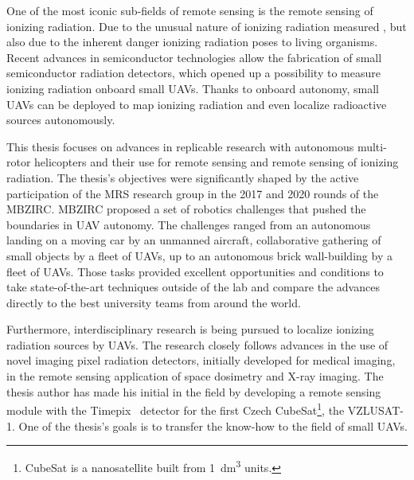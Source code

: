 \documentclass[a4paper,11pt,twoside,openright]{book}
\begin{document}
One of the most iconic sub-fields of remote sensing is the remote sensing of ionizing radiation.
Due to the unusual nature of ionizing radiation measured \cite{andreo2017fundamentals}, but also due to the inherent danger ionizing radiation poses to living organisms.
Recent advances in semiconductor technologies allow the fabrication of small semiconductor radiation detectors, which opened up a possibility to measure ionizing radiation onboard small \acp{UAV}.
Thanks to onboard autonomy, small \acp{UAV} can be deployed to map ionizing radiation and even localize radioactive sources autonomously.

This thesis focuses on advances in replicable research with autonomous multi-rotor helicopters and their use for remote sensing and remote sensing of ionizing radiation.
The thesis's objectives were significantly shaped by the active participation of the \ac{MRS} research group in the 2017 and 2020 rounds of the \ac{MBZIRC}.
MBZIRC proposed a set of robotics challenges that pushed the boundaries in \ac{UAV} autonomy.
The challenges ranged from an autonomous landing on a moving car by an unmanned aircraft, collaborative gathering of small objects by a fleet of \acp{UAV}, up to an autonomous brick wall-building by a fleet of \acp{UAV}.
Those tasks provided excellent opportunities and conditions to take state-of-the-art techniques outside of the lab and compare the advances directly to the best university teams from around the world.

Furthermore, interdisciplinary research is being pursued to localize ionizing radiation sources by \acp{UAV}.
The research closely follows advances in the use of novel imaging pixel radiation detectors, initially developed for medical imaging, in the remote sensing application of space dosimetry and X-ray imaging.
The thesis author has made his initial in the field by developing a remote sensing module with the Timepix~\cite{llopart2007timepix} detector for the first Czech CubeSat\footnote{CubeSat is a nanosatellite built from \SI{1}{\deci\meter\cubed} units.}, the \acs{VZLU}SAT-1.
One of the thesis's goals is to transfer the know-how to the field of small \aclp{UAV}.
\end{document}
